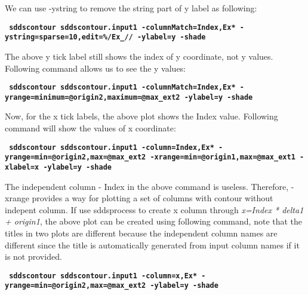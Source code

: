 \begin{itemize}
\begin{itemize}
        We can use -ystring to remove the string part of y label as following:
        \begin{flushleft}{\tt \bf
            sddscontour sddscontour.input1 -columnMatch=Index,Ex* -ystring=sparse=10,edit=\%/Ex\_// -ylabel=y -shade    
        }\end{flushleft}

        The above y tick label still shows the index of y coordinate, not y values. Following command allows us to see the y values:
        \begin{flushleft}{\tt \bf
            sddscontour sddscontour.input1 -columnMatch=Index,Ex* -yrange=minimum=@origin2,maximum=@max\_ext2 -ylabel=y -shade          
        }\end{flushleft}

        Now, for the x tick labels, the above plot shows the Index value. Following command will show the values of x coordinate:
    
        \begin{flushleft}{\tt \bf
        sddscontour sddscontour.input1 -column=Index,Ex* -yrange=min=@origin2,max=@max\_ext2 -xrange=min=@origin1,max=@max\_ext1 -xlabel=x -ylabel=y  -shade   
        }\end{flushleft}  
        
        The independent column - Index in the above command is useless. Therefore, -xrange provides a way for plotting a set of columns with contour without indepent column. If use sddsprocess to create x column through {\em x=Index * delta1 + origin1}, the above plot can be created using following command, note that the titles in two plots are different because the independent column names are different since the title is automatically generated from input column names if it is not provided.

        \begin{flushleft}{\tt \bf
        sddscontour sddscontour.input1 -column=x,Ex* -yrange=min=@origin2,max=@max\_ext2 -ylabel=y -shade   
        }\end{flushleft}  



\end{itemize}
\end{itemize}
